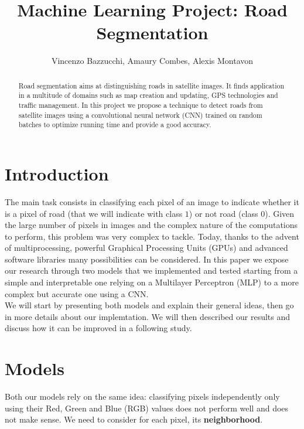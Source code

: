 \documentclass[10pt,conference,compsocconf]{IEEEtran}
\begin{document}
\title{Machine Learning Project: Road Segmentation}

\author{Vincenzo Bazzucchi, Amaury Combes, Alexis Montavon}

\maketitle

\begin{abstract}
Road segmentation aims at distinguishing roads in satellite images.
It finds application in a multitude of domains such as map creation and updating, GPS technologies and traffic management. In this project we propose a technique to detect roads from satellite images using a convolutional neural network (CNN) trained on random batches to optimize running time and provide a good accuracy.
\end{abstract}

\section{Introduction}
The main task consists in classifying each pixel of an image to indicate whether it is a pixel of road (that we will indicate with class $1$) or not road (class $0$). Given the large number of pixels in images and the complex nature of the computations to perform, this problem was very complex to tackle. Today, thanks to the advent of multiprocessing, powerful Graphical Processing Units (GPUs) and advanced software libraries many possibilities can be considered. In this paper we expose our research through two models that we implemented and tested starting from a simple and interpretable one relying on a Multilayer Perceptron (MLP) to a more complex but accurate one using a CNN.\\
We will start by presenting both models and explain their general ideas, then go in more details about our implemtation. We will then described our results and discuss how it can be improved in a following study.

\section{Models}
Both our models rely on the same idea: classifying pixels independently only using their Red, Green and Blue (RGB) values does not perform well and does not make sense. We need to consider for each pixel, its \textbf{neighborhood}.
\end{document}
